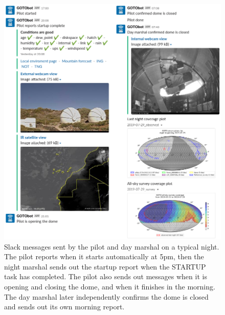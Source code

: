 \begin{colsection}
\begin{colsection}
\begin{figure}[p]
    \begin{center}
        \includegraphics[width=\linewidth]{images/slack2.png}
    \end{center}
    \caption[Slack messages sent by the pilot and day marshal]{
        Slack messages sent by the pilot and day marshal on a typical night. The pilot reports when it starts automatically at 5pm, then the night marshal sends out the startup report when the STARTUP task has completed. The pilot also sends out messages when it is opening and closing the dome, and when it finishes in the morning. The day marshal later independently confirms the dome is closed and sends out its own morning report.
    }\label{fig:pilot_slack}
\end{figure}

\end{colsection}


\end{colsection}


\newpage
